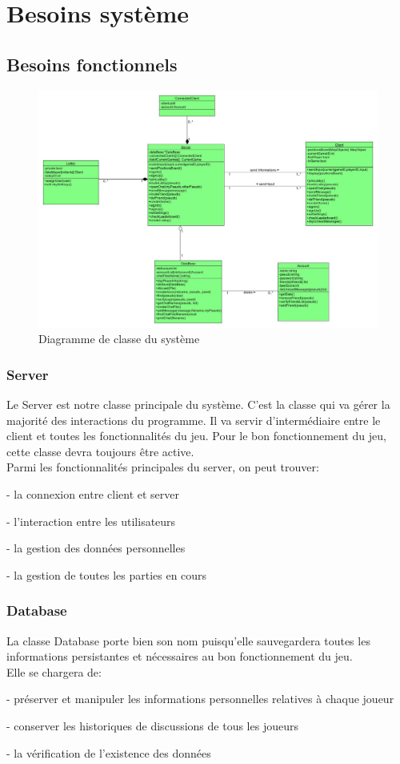 \documentclass[utf8]{article}
\begin{document}
\section{Besoins système}
\subsection{Besoins fonctionnels}
\begin{figure}[h!]
\centering
\includegraphics[width=16cm]{newSystemClassDiagram.jpg}
\caption{Diagramme de classe du système}
\label{fig:UerUseCase}
\end{figure}
\subsubsection{Server}
Le Server est notre classe principale du système. C'est la classe qui va gérer la majorité des interactions du programme. Il va servir d'intermédiaire entre le client et toutes les fonctionnalités du jeu. Pour le bon fonctionnement du jeu, cette classe devra toujours être active.\\
Parmi les fonctionnalités principales du server, on peut trouver:\\
\item- la connexion entre client et server
\item- l'interaction entre les utilisateurs
\item- la gestion des données personnelles
\item- la gestion de toutes les parties en cours
\subsubsection{Database}
La classe Database porte bien son nom puisqu'elle sauvegardera toutes les informations persistantes et nécessaires au bon fonctionnement du jeu.\\
Elle se chargera de:\\
\item- préserver et manipuler les informations personnelles relatives à chaque joueur
\item- conserver les historiques de discussions de tous les joueurs
\item- la vérification de l'existence des données
\end{document}
